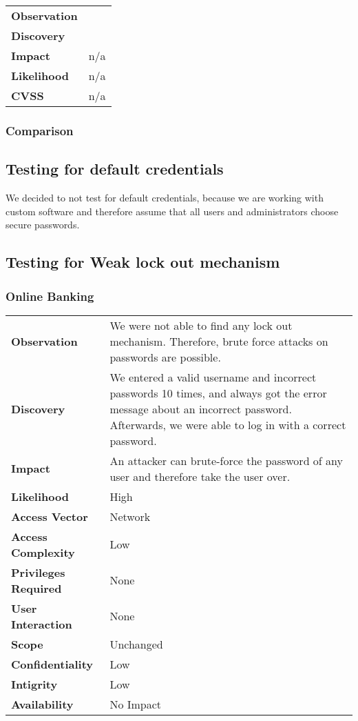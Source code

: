 \begin{tabular}{l|p{10cm}}

\textbf{Observation} &  \\
\textbf{Discovery} & \\
\textbf{Impact} & n/a \\
\textbf{Likelihood} & n/a \\
\textbf{CVSS} & n/a \\
\end{tabular}

\subsubsection*{Comparison}

\clearpage


\subsection{Testing for default credentials}
We decided to not test for default credentials, because we are working with custom software and therefore assume that all users and administrators choose secure passwords.

\clearpage


\subsection{Testing for Weak lock out mechanism}

\subsubsection*{Online Banking}

\begin{tabular}{l|p{10cm}}

\textbf{Observation} & We were not able to find any lock out mechanism. Therefore, brute force attacks on passwords are possible. \\
\textbf{Discovery} & We entered a valid username and incorrect passwords 10 times, and always got the error message about an incorrect password. Afterwards, we were able to log in with a correct password. \\
\textbf{Impact} & An attacker can brute-force the password of any user and therefore take the user over. \\
\textbf{Likelihood} & High \\
\textbf{Access Vector} & Network \\
\textbf{Access Complexity} & Low \\
\textbf{Privileges Required} & None \\
\textbf{User Interaction} & None \\
\textbf{Scope} & Unchanged \\
\textbf{Confidentiality} & Low \\
\textbf{Intigrity} & Low \\
\textbf{Availability} & No Impact \\
\end{tabular}

